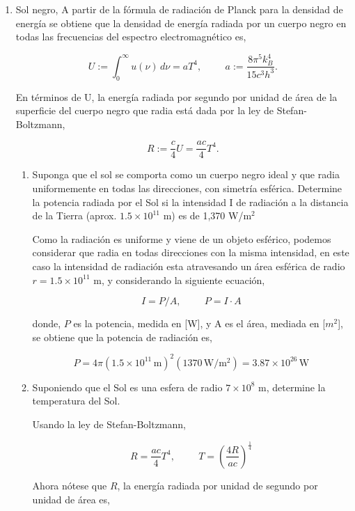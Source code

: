 \documentclass[12pt,a4paper]{article}
\begin{document}
\begin{enumerate}

\item Sol negro, A partir de la fórmula de radiación de Planck para la densidad de energía se obtiene que la densidad de energía radiada por un cuerpo negro en todas las frecuencias del espectro electromagnético es,
 
$$
U := \int_{0}^{\infty} u(\nu) \, d\nu= aT^{4}, \hspace{1cm} a := \frac{8\pi^{5}k_{B}^{4}}{15c^{3}h^{3}}.
$$

En términos de U, la energía radiada por segundo por unidad de área de la superficie del cuerpo negro que radia está dada por la ley de Stefan-Boltzmann, 

$$
R := \frac{c}{4}U = \frac{ac}{4}T^{4}.
$$

\begin{enumerate}

\item Suponga que el sol se comporta como un cuerpo negro ideal y que radia uniformemente en todas las direcciones, con simetría esférica. Determine la potencia radiada por el Sol si la intensidad I de radiación a la distancia de la Tierra (aprox. $1.5 \times 10^{11}$ m) es de 1,370 W/$\mathrm{m}^2$

Como la radiación es uniforme y viene de un objeto esférico, podemos considerar que radia en todas direcciones con la misma intensidad, en este caso la intensidad de radiación esta atravesando un área esférica de radio $ r = 1.5 \times 10^{11}$ m, y considerando la siguiente ecuación, 

$$
I = P / A, \hspace{1cm} P = I \cdot A
$$

donde, $P$ es la potencia, medida en [W], y A es el área, mediada en [$m^2$], se obtiene que la potencia de radiación es, 

$$
P = 4 \pi (1.5 \times 10^{11} \, \mathrm{m})^2 \left( 1370 \, \mathrm{W}/\mathrm{m}^2 \right) = 3.87 \times 10^{26} \, \mathrm{W}
$$

\item Suponiendo que el Sol es una esfera de radio $7 \times 10^8$ m, determine la temperatura del Sol.

Usando la ley de Stefan-Boltzmann, 

$$
R = \frac{ac}{4}T^{4}, \hspace{1cm} T = \left(\frac{4R}{ac} \right)^\frac{1}{4}
$$

Ahora nótese que $R$, la energía radiada por unidad de segundo por unidad de área es, 


\end{enumerate}
\end{enumerate}
\end{document}
